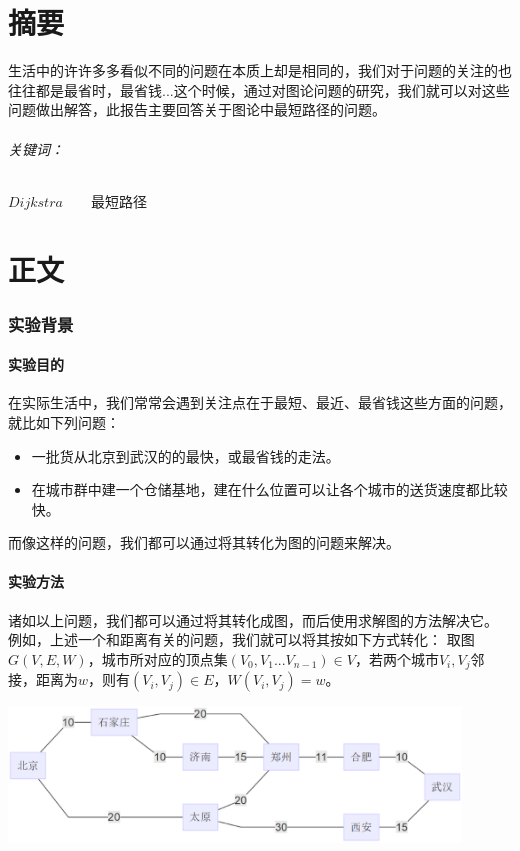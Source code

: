 \documentclass[a4paper,10pt]{ctexart}
\begin{document}
\part*{摘要}
生活中的许许多多看似不同的问题在本质上却是相同的，我们对于问题的关注的也往往都是最省时，最省钱...这个时候，通过对图论问题的研究，我们就可以对这些问题做出解答，此报告主要回答关于图论中最短路径的问题。
\paragraph{关键词：}$Dijkstra$\ \ \ \ 最短路径
\tableofcontents

\newpage
\part{正文}
\section{实验背景}

\subsection{实验目的}
在实际生活中，我们常常会遇到关注点在于最短、最近、最省钱这些方面的问题，就比如下列问题：
\begin{itemize}
\item 一批货从北京到武汉的的最快，或最省钱的走法。
\item 在城市群中建一个仓储基地，建在什么位置可以让各个城市的送货速度都比较快。
\end{itemize}
而像这样的问题，我们都可以通过将其转化为图的问题来解决。

\subsection{实验方法}
诸如以上问题，我们都可以通过将其转化成图，而后使用求解图的方法解决它。
例如，上述一个和距离有关的问题，我们就可以将其按如下方式转化：
取图$G(V,E,W)$，城市所对应的顶点集$(V_0,V_1...V_{n-1}) \in V $，若两个城市$V_i,V_j$邻接，距离为$w$，则有$(V_i,V_j)\in E$，$W(V_i,V_j)=w$。

\includegraphics[width=0.9\textwidth]{../Pics/MiniLen.eps}
\end{document}
